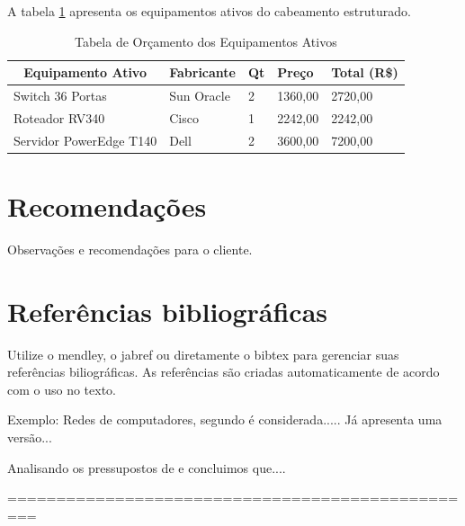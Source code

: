 \documentclass[	DIV=calc,%
							paper=a4,%
							fontsize=12pt,%
							onecolumn]{scrartcl}	 					%
\begin{document}
A tabela \ref{tab:orcAtivos} apresenta os equipamentos ativos do cabeamento estruturado.

\begin{table}[]
	\begin{tabular}{|l|l|l|l|l|}
		\hline
		\multicolumn{1}{|c|}{\textbf{Equipamento Ativo}} & \multicolumn{1}{c|}{\textbf{Fabricante}} & \multicolumn{1}{c|}{\textbf{Qt}} & \textbf{Preço} & \textbf{Total (R\$)} \\ \hline
		Switch 36 Portas                                 & Sun Oracle                               & 2                                & 1360,00        & 2720,00              \\ \hline
		Roteador RV340                                   & Cisco                                    & 1                                & 2242,00        & 2242,00              \\ \hline
		Servidor PowerEdge T140                          & Dell                                     & 2                                & 3600,00        & 7200,00              \\ \hline
	\end{tabular}
\caption{Tabela de Orçamento dos Equipamentos Ativos}
\label{tab:orcAtivos}
\end{table}

\section{Recomendações}
Observações e recomendações para o cliente.

\section{Referências bibliográficas}
Utilize o mendley, o jabref ou diretamente o bibtex para gerenciar suas referências biliográficas. As referências são criadas automaticamente de acordo com o uso no texto.

Exemplo: Redes de computadores, segundo \cite{t2013} é considerada..... Já \cite{kurose2010} apresenta uma versão...

Analisando os pressupostos de \cite{ref3} e \cite{ref4} concluimos que....


\renewcommand\refname{} %

  

=================================================
\end{document}
